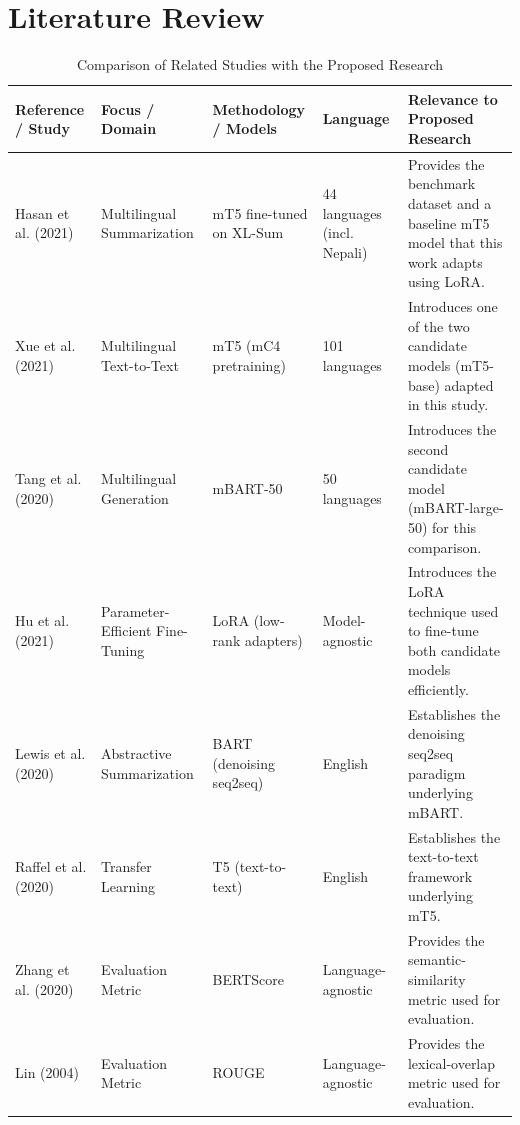 \documentclass[12pt]{report}
\begin{document}
\chapter{Literature Review}
\begin{table}[htbp]
\centering
\footnotesize
\caption{Comparison of Related Studies with the Proposed Research}
\label{tab:literature_comparison}
\renewcommand{\arraystretch}{1.3}

\begin{tabularx}{\textwidth}{|p{2.3cm}|p{2.0cm}|p{2.6cm}|p{1.6cm}|X|}
\hline
\textbf{Reference / Study} &
\textbf{Focus / Domain} &
\textbf{Methodology / Models} &
\textbf{Language} &
\textbf{Relevance to Proposed Research} \\
\hline

Hasan et al. (2021) &
Multilingual Summarization &
mT5 fine-tuned on XL-Sum &
44 languages (incl. Nepali) &
Provides the benchmark dataset and a baseline mT5 model that this work adapts using LoRA. \\
\hline

Xue et al. (2021) &
Multilingual Text-to-Text &
mT5 (mC4 pretraining) &
101 languages &
Introduces one of the two candidate models (mT5-base) adapted in this study. \\
\hline

Tang et al. (2020) &
Multilingual Generation &
mBART-50 &
50 languages &
Introduces the second candidate model (mBART-large-50) for this comparison. \\
\hline

Hu et al. (2021) &
Parameter-Efficient Fine-Tuning &
LoRA (low-rank adapters) &
Model-agnostic &
Introduces the LoRA technique used to fine-tune both candidate models efficiently. \\
\hline

Lewis et al. (2020) &
Abstractive Summarization &
BART (denoising seq2seq) &
English &
Establishes the denoising seq2seq paradigm underlying mBART. \\
\hline

Raffel et al. (2020) &
Transfer Learning &
T5 (text-to-text) &
English &
Establishes the text-to-text framework underlying mT5. \\
\hline

Zhang et al. (2020) &
Evaluation Metric &
BERTScore &
Language-agnostic &
Provides the semantic-similarity metric used for evaluation. \\
\hline

Lin (2004) &
Evaluation Metric &
ROUGE &
Language-agnostic &
Provides the lexical-overlap metric used for evaluation. \\
\hline

\end{tabularx}
\end{table}
\end{document}

